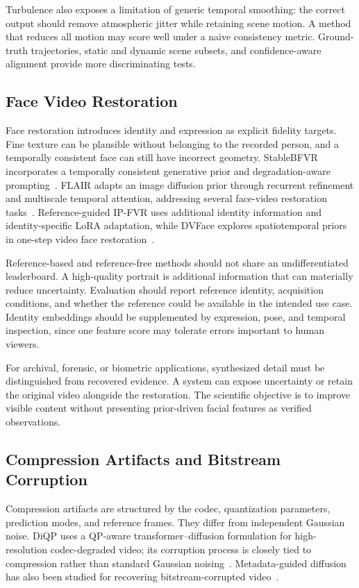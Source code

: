 Turbulence also exposes a limitation of generic temporal smoothing: the correct output should remove atmospheric jitter while retaining scene motion. A method that reduces all motion may score well under a naive consistency metric. Ground-truth trajectories, static and dynamic scene subsets, and confidence-aware alignment provide more discriminating tests.

\subsection{Face Video Restoration}
Face restoration introduces identity and expression as explicit fidelity targets. Fine texture can be plausible without belonging to the recorded person, and a temporally consistent face can still have incorrect geometry. StableBFVR incorporates a temporally consistent generative prior and degradation-aware prompting~\cite{stablebfvr}. FLAIR adapts an image diffusion prior through recurrent refinement and multiscale temporal attention, addressing several face-video restoration tasks~\cite{flair}. Reference-guided IP-FVR uses additional identity information and identity-specific LoRA adaptation, while DVFace explores spatiotemporal priors in one-step video face restoration~\cite{ipfvr,dvface}.

Reference-based and reference-free methods should not share an undifferentiated leaderboard. A high-quality portrait is additional information that can materially reduce uncertainty. Evaluation should report reference identity, acquisition conditions, and whether the reference could be available in the intended use case. Identity embeddings should be supplemented by expression, pose, and temporal inspection, since one feature score may tolerate errors important to human viewers.

For archival, forensic, or biometric applications, synthesized detail must be distinguished from recovered evidence. A system can expose uncertainty or retain the original video alongside the restoration. The scientific objective is to improve visible content without presenting prior-driven facial features as verified observations.

\subsection{Compression Artifacts and Bitstream Corruption}
Compression artifacts are structured by the codec, quantization parameters, prediction modes, and reference frames. They differ from independent Gaussian noise. DiQP uses a QP-aware transformer--diffusion formulation for high-resolution codec-degraded video; its corruption process is closely tied to compression rather than standard Gaussian noising~\cite{diqp}. Metadata-guided diffusion has also been studied for recovering bitstream-corrupted video~\cite{bitstream}.


